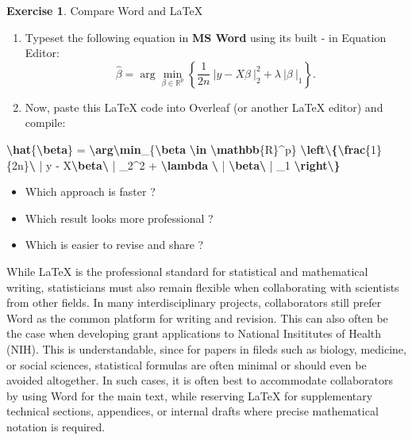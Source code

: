 \documentclass[
]{book}
\newenvironment{Shaded}{\begin{snugshade}}{\end{snugshade}}
\newcommand{\FunctionTok}[1]{\textcolor[rgb]{0.13,0.29,0.53}{\textbf{#1}}}
\newcommand{\NormalTok}[1]{#1}
\providecommand{\tightlist}{%
  \setlength{\itemsep}{0pt}\setlength{\parskip}{0pt}}
\theoremstyle{definition}
\theoremstyle{definition}
\theoremstyle{definition}
\newtheorem{exercise}{Exercise}[chapter]
\theoremstyle{definition}
\theoremstyle{remark}
\begin{document}
\begin{exercise}

Compare Word and LaTeX

\begin{enumerate}
\def\labelenumi{\arabic{enumi}.}
\item
  Typeset the following equation in \textbf{MS Word} using its built - in Equation Editor:
  \[
  \hat{\beta} = \arg\min_{\beta \in \mathbb{R}^p}\left\{\frac{1}{2n}\ | y - X\beta\ | _2^2 + \lambda \ | \beta\ | _1 \right\}.
  \]
\item
  Now, paste this LaTeX code into Overleaf (or another LaTeX editor) and compile:
\end{enumerate}

\begin{Shaded}
\begin{Highlighting}[]
\FunctionTok{\textbackslash{}hat}\NormalTok{\{}\FunctionTok{\textbackslash{}beta}\NormalTok{\} = }\FunctionTok{\textbackslash{}arg\textbackslash{}min}\NormalTok{\_\{}\FunctionTok{\textbackslash{}beta} \FunctionTok{\textbackslash{}in} \FunctionTok{\textbackslash{}mathbb}\NormalTok{\{R\}\^{}p\}}
\FunctionTok{\textbackslash{}left\textbackslash{}\{\textbackslash{}frac}\NormalTok{\{1\}\{2n\}}\FunctionTok{\textbackslash{} }\NormalTok{| y {-} X}\FunctionTok{\textbackslash{}beta\textbackslash{} }\NormalTok{| \_2\^{}2 + }\FunctionTok{\textbackslash{}lambda} \FunctionTok{\textbackslash{} }\NormalTok{| }\FunctionTok{\textbackslash{}beta\textbackslash{} }\NormalTok{| \_1 }\FunctionTok{\textbackslash{}right\textbackslash{}\}}
\end{Highlighting}
\end{Shaded}

\begin{itemize}
\tightlist
\item
  Which approach is faster ?
\item
  Which result looks more professional ?
\item
  Which is easier to revise and share ?
\end{itemize}

\end{exercise}

While LaTeX is the professional standard for statistical and mathematical
writing, statisticians must also remain flexible when collaborating with
scientists from other fields. In many interdisciplinary projects, collaborators
still prefer Word as the common platform for writing and revision. This can also
often be the case when developing grant applications to
National Insititutes of Health (NIH).
This is understandable, since for papers in fileds such as biology, medicine, or social
sciences, statistical formulas are often minimal or should even be avoided
altogether. In such cases, it is often best to accommodate collaborators by
using Word for the main text, while reserving LaTeX for supplementary technical
sections, appendices, or internal drafts where precise mathematical notation is
required.
\end{document}
